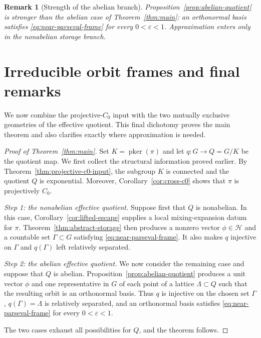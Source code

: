 \documentclass[10pt,a4paper]{amsart}
\numberwithin{equation}{section}
\newtheorem{remark}[theorem]{Remark}
\newcommand{\cH}{\mathcal H}
\newcommand{\pker}{\operatorname{pker}}
\newcommand{\Step}[1]{\par\medskip\noindent\textit{#1.}\quad}
\begin{document}
\begin{remark}[Strength of the abelian branch]
Proposition~\ref{prop:abelian-quotient} is stronger than the abelian case of
Theorem~\ref{thm:main}: an orthonormal basis satisfies
\eqref{eq:near-parseval-frame} for every $0<\varepsilon<1$.  Approximation enters only
in the nonabelian storage branch.
\end{remark}

\section{Irreducible orbit frames and final remarks}
\label{sec:proof-main}

We now combine the projective-$C_0$ input with the two mutually exclusive
geometries of the effective quotient.  This final dichotomy proves the main
theorem and also clarifies exactly where approximation is needed.


\begin{proof}[Proof of Theorem~\ref{thm:main}]
Set $K=\pker(\pi)$ and let $q:G\to Q=G/K$ be the quotient map.  We first
collect the structural information proved earlier.  By
Theorem~\ref{thm:projective-c0-input}, the subgroup $K$ is connected and the
quotient $Q$ is exponential.  Moreover,
Corollary~\ref{cor:cross-c0} shows that $\pi$ is projectively $C_0$.

\Step{Step 1: the nonabelian effective quotient}
Suppose first that $Q$ is nonabelian.  In this case,
Corollary~\ref{cor:lifted-escape} supplies a
local mixing-expansion datum for $\pi$.  Theorem~\ref{thm:abstract-storage}
then produces a nonzero vector
$\phi\in\cH$ and a countable set $\Gamma\subset G$ satisfying
\eqref{eq:near-parseval-frame}.  It also makes $q$ injective on $\Gamma$ and
$q(\Gamma)$ left relatively separated.

\Step{Step 2: the abelian effective quotient}
We now consider the remaining case and suppose that $Q$ is abelian.
Proposition~\ref{prop:abelian-quotient}
produces a unit vector $\phi$ and one representative in $G$ of each point of
a lattice $\Lambda\subset Q$ such that the resulting orbit is an
orthonormal basis.  Thus $q$ is injective on the chosen set $\Gamma$,
$q(\Gamma)=\Lambda$ is relatively separated, and an orthonormal basis
satisfies \eqref{eq:near-parseval-frame} for every
$0<\varepsilon<1$.

The two cases exhaust all possibilities for $Q$, and the theorem follows.
\end{proof}
\end{document}
